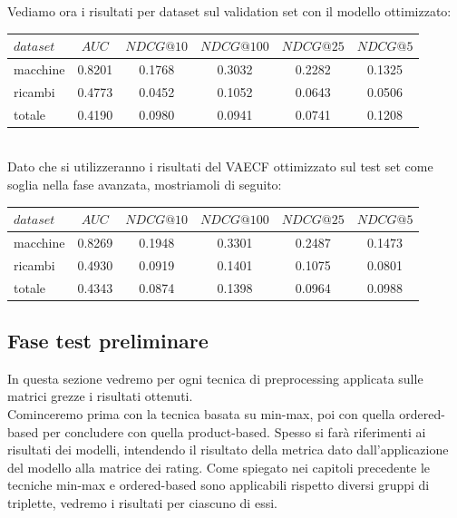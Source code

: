 Vediamo ora i risultati per dataset sul validation set con il modello ottimizzato:\\

\begin{tabular}{|l|c|cccc|}
    \toprule
    $dataset$ &    $AUC$ &  $NDCG@10$ & $NDCG@100$  & $NDCG@25$ & $NDCG@5$  \\
    \midrule
    macchine & 0.8201 & 0.1768 & 0.3032 & 0.2282 & 0.1325 \\
    ricambi & 0.4773 & 0.0452 & 0.1052 & 0.0643 & 0.0506 \\
    totale  & 0.4190 & 0.0980 & 0.0941 & 0.0741 & 0.1208 \\
\bottomrule
\end{tabular}\\

Dato che si utilizzeranno i risultati del VAECF ottimizzato sul test set come soglia nella fase avanzata, mostriamoli di seguito:\\

\begin{tabular}{|l|c|cccc|}
    \toprule
    $dataset$ &    $AUC$ &  $NDCG@10$ & $NDCG@100$  & $NDCG@25$ & $NDCG@5$  \\
    \midrule
    macchine & 0.8269 &  0.1948 &   0.3301 &  0.2487 & 0.1473 \\
    ricambi  & 0.4930 &  0.0919 &   0.1401 &  0.1075 & 0.0801 \\
    totale  & 0.4343 &  0.0874 &   0.1398 &  0.0964 & 0.0988 \\

\bottomrule
\end{tabular}

\subsection{Fase test preliminare}
In questa sezione vedremo per ogni tecnica di preprocessing applicata sulle matrici grezze i risultati ottenuti.\\
Cominceremo prima con la tecnica basata su min-max, poi con quella ordered-based per concludere con quella product-based. 
Spesso si farà riferimenti ai risultati dei modelli, intendendo il risultato della metrica dato dall'applicazione del modello alla matrice dei rating.
Come spiegato nei capitoli precedente le tecniche min-max e ordered-based sono applicabili rispetto diversi gruppi di triplette, vedremo i risultati per ciascuno di essi.\\




